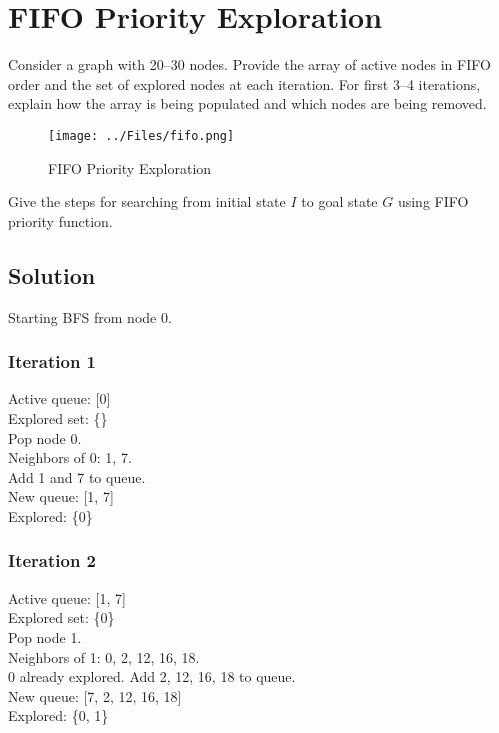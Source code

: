 \section*{FIFO Priority Exploration}

Consider a graph with 20--30 nodes.
Provide the array of active nodes in FIFO order and the set of explored nodes at each iteration.
For first 3--4 iterations, explain how the array is being populated and which nodes are being removed.

\begin{figure}[htbp]
      \centering
      \texttt{[image: ../Files/fifo.png]}
      \vspace*{-2em}
      \caption{
            FIFO Priority Exploration
      }\label{fig:q1}
\end{figure}

Give the steps for searching from initial state \(I\) to  goal state \(G\) using FIFO priority function.

\subsection*{Solution}

Starting BFS from node 0.

\subsubsection*{Iteration 1}
Active queue: [0] \\
Explored set: \{\} \\
Pop node 0. \\
Neighbors of 0: 1, 7. \\
Add 1 and 7 to queue. \\
New queue: [1, 7] \\
Explored: \{0\}

\subsubsection*{Iteration 2}
Active queue: [1, 7] \\
Explored set: \{0\} \\
Pop node 1. \\
Neighbors of 1: 0, 2, 12, 16, 18. \\
0 already explored. Add 2, 12, 16, 18 to queue. \\
New queue: [7, 2, 12, 16, 18] \\
Explored: \{0, 1\}

